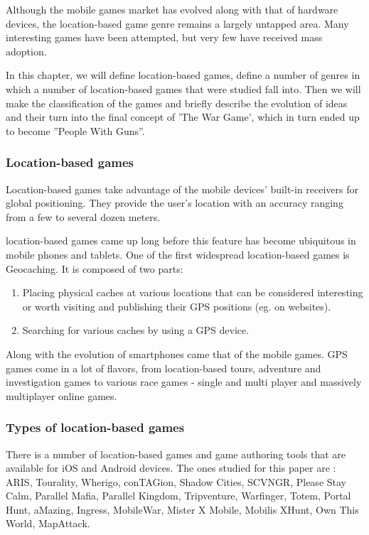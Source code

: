 Although the mobile games market has evolved along with that of hardware
devices, the location-based game genre remains a largely untapped area. Many
interesting games have been attempted, but very few have received mass
adoption.\newline

In this chapter, we will define location-based games, define a number of
genres in which a number of location-based games that were studied fall
into. Then we will make the classification of the games and briefly describe the
evolution of ideas and their turn into the final concept of 'The War Game',
which in turn ended up to become ''People With Guns''.


\subsubsection{Location-based games}
Location-based games take advantage of the mobile devices' built-in receivers
for global positioning. They provide the user's location with an accuracy
ranging from a few to several dozen meters. \newline

location-based games came up long before this feature has become ubiquitous in mobile
phones and tablets. One of the first widespread location-based games is Geocaching.
It is composed of two parts:

\begin{enumerate}
  \item Placing physical caches at various locations that can be considered
  interesting or worth visiting and publishing their GPS positions (eg. on
  websites).
  \item Searching for various caches by using a GPS device.
\end{enumerate}

Along with the evolution of smartphones came that of the mobile games. GPS games
come in a lot of flavors, from location-based tours, adventure and investigation
games to various race games - single and multi player and massively multiplayer
online games.


\subsubsection{Types of location-based games}

There is a number of location-based games and game authoring tools that are
available for iOS and Android devices. The ones studied for this paper are :
ARIS, Tourality, Wherigo, conTAGion, Shadow Cities, SCVNGR, Please Stay Calm,
Parallel Mafia, Parallel Kingdom, Tripventure, Warfinger, Totem, Portal Hunt,
aMazing, Ingress, MobileWar, Mister X Mobile, Mobilis XHunt, Own This World,
MapAttack.\newline

